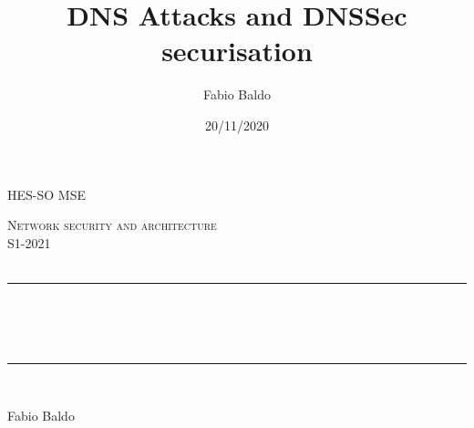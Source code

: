 
\title{DNS Attacks and DNSSec securisation}													%
\author{Fabio Baldo}														%
\date{20/11/2020}														%



\makeatletter
\let\thetitle\@title
\let\theauthor\@author
\let\thedate\@date
\makeatother
\pagestyle{fancy}
\fancyhf{}
\rhead{\theauthor}
\lhead{\thetitle}
\cfoot{\thepage}
\newcommand{\mis}[3]{(#1 \pm #2) \ #3}
\newcommand{\misp}[3]{(#1 \#3 \pm #2}



\begin{titlepage}
	
    \begin{center}				
    \textsc{\LARGE HES-SO MSE}\\[2.0 cm]						%
    
        \vspace*{2.00 cm}
    
	\textsc{\Large Network security and architecture}\\[0.30 cm]		%
	\textsc{\Large S1-2021 }\\[0.5 cm]		%
	\textsc{\Large  }\\[0.5 cm] %
	\rule{\linewidth}{0.2 mm} \\[0.4 cm]
	{ \huge \bfseries \thetitle \\ \small \thedate}\\
	\rule{\linewidth}{0.2 mm} \\[1.5 cm]
	
    	\begin{center}
    	    Fabio Baldo
    	\end{center}
    	
	\end{center}
\end{titlepage}
